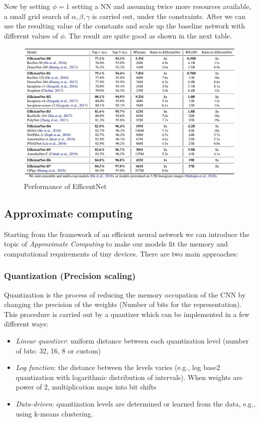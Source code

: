 \documentclass{article}
\begin{document}
        Now by setting $\phi =1$ setting a NN and assuming twice more resources available, a small grid search of $\alpha, \beta, \gamma$ is carried out, under the constraints. After we can use the resulting value of the constants
        and scale up the baseline network with different values of $\phi$. The result are quite good as shown in the next table.

        \begin{figure}[H]
          \includegraphics[scale=0.3]{../Images/EnetPreformance.png}
          \centering
          \caption{Performance of EfficentNet}
        \end{figure}
    \subsection{Approximate computing}
      Starting from the framework of an efficient neural network we can introduce the topic of \emph{Approximate Computing} to make our models fit the memory and computational requirements of tiny devices. There are two main approaches:
      \subsubsection{Quantization (Precision scaling)}
        Quantization is the process of reducing the memory occupation of the CNN by changing the precision of the weights (Number of bits for the representation). This procedure is carried out by a quantizer which can be implemented in a few different ways:

        \begin{itemize}
          \item \emph{Linear quantizer}: uniform distance between each quantization level (number of bits: 32, 16, 8 or custom)
          \item \emph{Log function}: the distance between the levels varies (e.g., log base2 quantization with logarithmic distribution of intervals). When weights are power of 2, multiplication maps into bit shifts
          \item \emph{Data-driven}: quantization levels are determined or learned from the data, e.g., using k-means clustering.
        \end{itemize}
\end{document}
